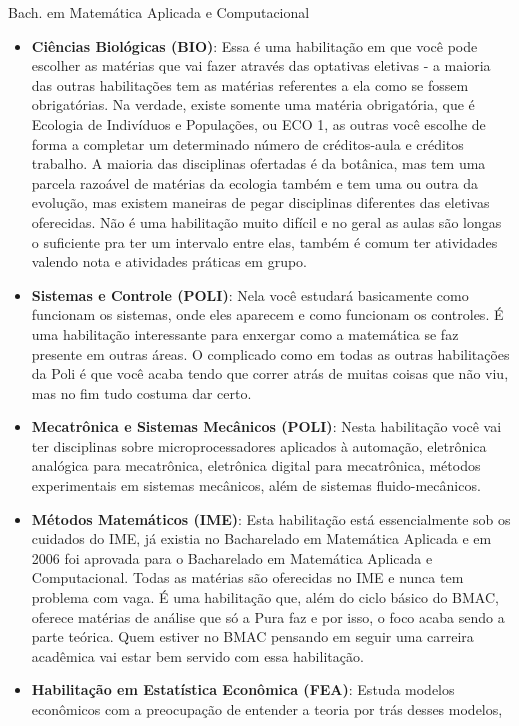 \begin{subsecao}{Bach. em Matemática Aplicada e Computacional}
\begin{itemize}
  \item \textbf{Ciências Biológicas (BIO)}:
    Essa é uma habilitação em que você pode escolher as matérias que vai fazer
    através das optativas eletivas - a maioria das outras habilitações tem as
    matérias referentes a ela como se fossem obrigatórias. Na verdade, existe
    somente uma matéria obrigatória, que é Ecologia de Indivíduos e Populações,
    ou ECO 1, as outras você escolhe de forma a completar um determinado número
    de créditos-aula e créditos trabalho. A maioria das disciplinas ofertadas
    é da botânica, mas tem uma parcela razoável de matérias da ecologia também
    e tem uma ou outra da evolução, mas existem maneiras de pegar disciplinas
    diferentes das eletivas oferecidas. Não é uma habilitação muito difícil e no
    geral as aulas são longas o suficiente pra ter um intervalo entre elas,
    também é comum ter atividades valendo nota e atividades práticas em grupo.
  \item \textbf{Sistemas e Controle (POLI)}: Nela você estudará basicamente como
    funcionam os sistemas, onde eles aparecem e como funcionam os controles.
    É uma habilitação interessante para enxergar como a matemática se faz presente 
    em outras áreas. O complicado como em todas as outras habilitações da Poli é 
    que você acaba tendo que correr atrás de muitas coisas que não viu, mas no
    fim tudo costuma dar certo.
  \item \textbf{Mecatrônica e Sistemas Mecânicos (POLI)}: Nesta habilitação você
    vai ter disciplinas sobre microprocessadores aplicados à automação,
    eletrônica analógica para mecatrônica, eletrônica digital para mecatrônica,
    métodos experimentais em sistemas mecânicos, além de sistemas
    fluido-mecânicos.
  \item \textbf{Métodos Matemáticos (IME)}: Esta habilitação está essencialmente
    sob os cuidados do IME, já existia no Bacharelado em Matemática Aplicada e
    em 2006 foi aprovada para o Bacharelado em Matemática Aplicada e
    Computacional. Todas as matérias são oferecidas no IME e nunca tem problema
    com vaga. É uma habilitação que, além do ciclo básico do BMAC, oferece
    matérias de análise que só a Pura faz e por isso, o foco acaba sendo a parte
    teórica. Quem estiver no BMAC pensando em seguir uma carreira acadêmica vai
    estar bem servido com essa habilitação.
  \item \textbf{Habilitação em Estatística Econômica (FEA)}: Estuda modelos
    econômicos com a preocupação de entender a teoria por trás desses modelos,

\end{itemize}
\end{subsecao}
